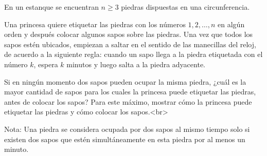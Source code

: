 En un estanque se encuentran $n \geq 3$ piedras dispuestas en una circunferencia.

Una princesa quiere etiquetar las piedras con los números $1,2, \ldots, n$ en algún orden y después colocar algunos sapos sobre las piedras. Una vez que todos los sapos estén ubicados, empiezan a saltar en el sentido de las manecillas del reloj, de acuerdo a la siguiente regla: cuando un sapo llega a la piedra etiquetada con el número $k$, espera $k$ minutos y luego salta a la piedra adyacente.

Si en ningún momento dos sapos pueden ocupar la misma piedra, ¿cuál es la mayor cantidad de sapos para los cuales la princesa puede etiquetar las piedras, antes de colocar los sapos? Para este máximo, mostrar cómo la princesa puede etiquetar las piedras y cómo colocar los sapos.<br>

Nota: Una piedra se considera ocupada por dos sapos al mismo tiempo solo si existen dos sapos que estén simultáneamente en esta piedra por al menos un minuto.